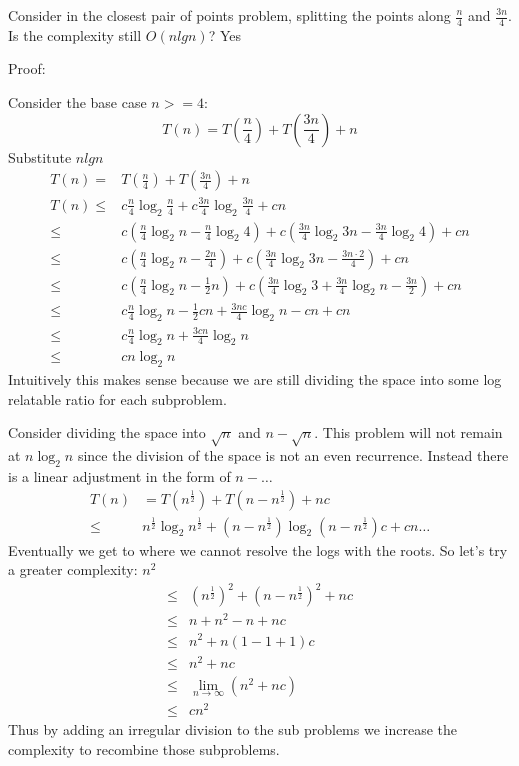\documentclass[12pt]{article}
\newenvironment{problem}[2][Problem]{\begin{trivlist}
\item[\hskip \labelsep {\bfseries #1}\hskip \labelsep {\bfseries #2.}]}{\end{trivlist}}
\begin{document}
\begin{problem}{2}
Consider in the closest pair of points problem, splitting the points along
$ \frac{n}{4}$ and $\frac{3n}{4}$. Is the complexity still $O(n lg n)$? Yes

Proof:

Consider the base case $ n >= 4$:
\begin{equation*}
    T(n) = T(\frac{n}{4}) + T(\frac{3n}{4}) + n
\end{equation*}
Substitute $n lg n$
\begin{align*}
    T(n) =& T(\frac{n}{4}) + T(\frac{3n}{4}) + n\\
    T(n) \le& c \frac{n}{4} \log_2{\frac{n}{4}}    + c \frac{3n}{4}\log_2{\frac{3n}{4}} + cn\\
    \le& c \left( \frac{n}{4} \log_2{n} - \frac{n}{4} \log_2{4} \right)
    + c \left(\frac{3n}{4} \log_2{3n} - \frac{3n}{4} \log_2{4} \right) + cn \\
    \le& c \left( \frac{n}{4} \log_2{n} - \frac{2n}{4} \right)  + c \left( \frac{3n}{4} \log_2{3n} - \frac{3n\cdot2}{4} \right) + cn \\
    \le& c\left(\frac{n}{4} \log_2{n} - \frac{1}{2}n\right)   + c \left(\frac{3n}{4} \log_2{3} + \frac{3n}{4} \log_2{n} - \frac{3n}{2}\right) + cn\\
    \le& c\frac{n}{4} \log_2{n} - \frac{1}{2}cn + \frac{3nc}{4} \log_2{n} - cn
    + cn\\
    \le& c\frac{n}{4} \log_2{n} + \frac{3cn}{4}\log_2{n} \\
    \le& cn\log_2{n}
\end{align*}
Intuitively this makes sense because we are still dividing the space into some
log relatable ratio for each subproblem. 

Consider dividing the space into $\sqrt{n}$ and $n-\sqrt{n}$. This problem will
not remain at $n \log_2{n}$ since the division of the space is not an even
recurrence. Instead there is a linear adjustment in the form of $n - \dots$
\begin{align*}
    T(n) &= T(n^{\frac{1}{2}}) + T(n-n^{\frac{1}{2}}) + nc\\
    \le& n^{\frac{1}{2}} \log_2{n^{\frac{1}{2}}} + \left(n-
    n^{\frac{1}{2}}\right) \log_2\left(n - n^{\frac{1}{2}}\right) c + cn
    \dots
\end{align*}
Eventually we get to where we cannot resolve the logs with the roots.  So let's
try a greater complexity: $n^2$
\begin{align*}
    \le& \left( n^{\frac{1}{2}} \right)^2 + \left( n - n^\frac{1}{2} \right)^2
    + nc\\
    \le& n + n^2 - n + nc\\
    \le& n^2 + n(1 - 1 + 1)c\\
    \le& n^2 + nc\\
    \le& \lim_{n\to \infty}\left(n^2 + nc\right)\\
    \le& cn^2
\end{align*}
Thus by adding an irregular division to the sub problems we increase the
complexity to recombine those subproblems.
\end{problem}
\end{document}
